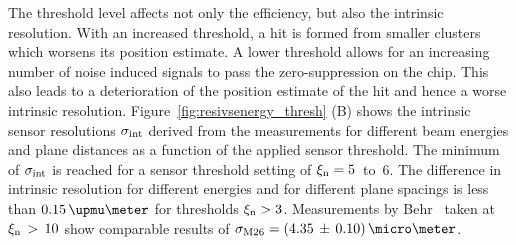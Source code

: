 The threshold level affects not only the efficiency, but also the intrinsic resolution. 
With an increased threshold, a hit is formed from smaller clusters which worsens its position estimate. 
A lower threshold allows for an increasing number of noise induced signals to pass the zero-suppression on the chip.
This also leads to a deterioration of the position estimate of the hit and hence a worse intrinsic resolution. 
Figure~\ref{fig:resivsenergy_thresh} (B) shows the intrinsic sensor resolutions $\sigma_{\textrm{int}}$ derived from the measurements for different beam energies and plane distances as a function of the applied sensor threshold.
The minimum of $\sigma_{\textrm{int}}$ is reached for a sensor threshold setting of $\xi_{\textrm{n}} = 5$~to~6.
The difference in intrinsic resolution for different energies and for different plane spacings is less than $0.15\,\upmu\meter$ for thresholds $\xi_{\textrm{n}} > 3$.
Measurements by Behr~\cite{ref:j.behrmeasurements} taken at $\xi_{\textrm{n}}\,>\,10$ show comparable results of $\sigma_{\textrm{M26}} = (4.35\,\pm\,0.10)\,\micro\meter$. %






